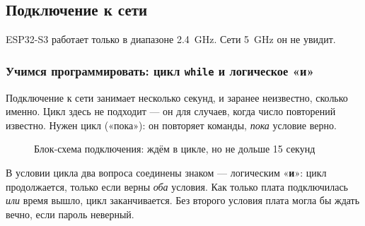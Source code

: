 \subsection{Подключение к сети}


\begin{caution}
ESP32-S3 работает только в диапазоне \SI{2.4}{GHz}. Сети \SI{5}{GHz} он не увидит.
\end{caution}

\subsubsection{Учимся программировать: цикл \texttt{while} и логическое «и»}

Подключение к сети занимает несколько секунд, и заранее неизвестно, сколько именно. Цикл  здесь
не подходит --- он для случаев, когда число повторений известно. Нужен цикл  («пока»): он
повторяет команды, \emph{пока} условие верно.

\begin{figure}[H]
\centering
{}
\caption{Блок-схема подключения: ждём в цикле, но не дольше 15 секунд}
\end{figure}

В условии цикла два вопроса соединены знаком \code{\&\&} --- логическим «\textbf{и}»: цикл продолжается, только
если верны \emph{оба} условия. Как только плата подключилась \emph{или} время вышло, цикл заканчивается.
Без второго условия плата могла бы ждать вечно, если пароль неверный.

